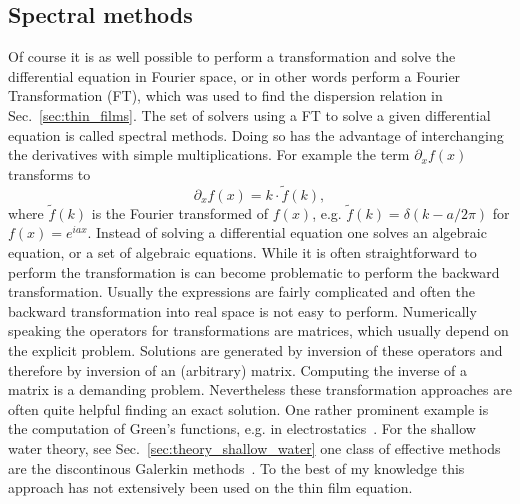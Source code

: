 \subsection{Spectral methods}
Of course it is as well possible to perform a transformation and solve the differential equation in Fourier space, or in other words perform a Fourier Transformation (FT), which was used to find the dispersion relation in Sec.~\ref{sec:thin_films}.
The set of solvers using a FT to solve a given differential equation is called spectral methods.
Doing so has the advantage of interchanging the derivatives with simple multiplications.
For example the term $\partial_x f(x)$ transforms to  
\begin{equation}\label{eq:fourier_transform}
    \partial_x f(x) = k\cdot \tilde{f}(k),
\end{equation}
where $\tilde{f}(k)$ is the Fourier transformed of $f(x)$, e.g. $\tilde{f}(k) = \delta(k - a/2\pi)$ for $f(x) = e^{iax}$. 
Instead of solving a differential equation one solves an algebraic equation, or a set of algebraic equations.
While it is often straightforward to perform the transformation is can become problematic to perform the backward transformation. 
Usually the expressions are fairly complicated and often the backward transformation into real space is not easy to perform.
Numerically speaking the operators for transformations are matrices, which usually depend on the explicit problem.
Solutions are generated by inversion of these operators and therefore by inversion of an (arbitrary) matrix.
Computing the inverse of a matrix is a demanding problem. 
Nevertheless these transformation approaches are often quite helpful finding an exact solution.
One rather prominent example is the computation of Green's functions, e.g. in electrostatics~\cite{eyges2012classical, green1889essay}.
For the shallow water theory, see Sec.~\ref{sec:theory_shallow_water} one class of effective methods are the discontinous Galerkin methods~\cite{ern2013theory}.
To the best of my knowledge this approach has not extensively been used on the thin film equation.


